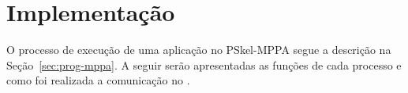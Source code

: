 %




%

\section{Implementação}
O processo de execução de uma aplicação no PSkel-MPPA segue a descrição na
Seção~\ref{sec:prog-mppa}. A seguir serão apresentadas as funções de cada
processo e como foi realizada a comunicação no \mppa.

